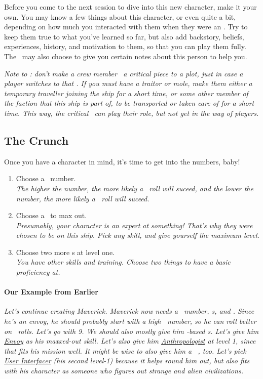 \par
Before you come to the next session to dive into this new character, make it your own. You may know a few things about this character, or even quite a bit, depending on how much you interacted with them when they were an \npcShort . Try to keep them true to what you've learned so far, but also add backstory, beliefs, experiences, history, and motivation to them, so that you can play them fully. The \gm\, may also choose to give you certain notes about this person to help you.

\par
\textit{Note to \gm : don't make a crew member \npcShort\, a critical piece to a plot, just in case a player switches to that \npcShort . If you must have a traitor or mole, make them either a temporary traveller joining the ship for a short time, or some other member of the faction that this ship is part of, to be transported or taken care of for a short time. This way, the critical \npcShort\, can play their role, but not get in the way of players.}

\subsection{The Crunch}

\par
Once you have a character in mind, it's time to get into the numbers, baby!
\begin{enumerate}
	\item Choose a \both\, number. \\
		\textit{The higher the number, the more likely a \feelings\, roll will suceed, and the lower the number, the more likely a \lasers\, roll will suceed.}
	\item Choose a \skill\, to max out.\\
		\textit{Presumably, your character is an expert at something! That's why they were chosen to be on this ship. Pick any skill, and give yourself the maximum level.}
	\item Choose two more \skill s at level one. \\
		\textit{You have other skills and training. Choose two things to have a basic proficiency at.}
\end{enumerate}

\paragraph{Our Example from Earlier}
\textit{Let's continue creating Maverick. Maverick now needs a \both\, number, \skill s, and \abilityP . Since he's an envoy, he should probably start with a high \both\, number, so he can roll better on \feelings\, rolls. Let's go with 9. We should also mostly give him \feelings -based \skill s. Let's give him \hyperlink{SkillEnvoy}{Envoy} as his maxxed-out skill. Let's also give him \hyperlink{SkillAnthropologist}{Anthropologist} at level 1, since that fits his mission well. It might be wise to also give him a \lasers\, \skill , too. Let's pick \hyperlink{SkillUserInterfacer}{User Interfacer} (his second level-1) because it helps round him out, but also fits with his character as someone who figures out strange and alien civilizations.}

